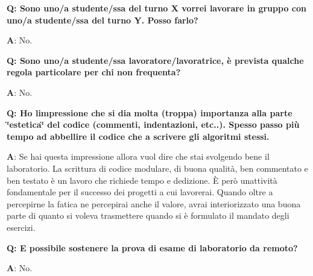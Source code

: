 {\bfseries{Q\+: Sono uno/a studente/ssa del turno X vorrei lavorare in gruppo con uno/a studente/ssa del turno Y. Posso farlo?}}

{\bfseries{A}}\+: No.

{\bfseries{Q\+: Sono uno/a studente/ssa lavoratore/lavoratrice, è prevista qualche regola particolare per chi non frequenta?}}

{\bfseries{A}}\+: No.

{\bfseries{Q\+: Ho l\textquotesingle{}impressione che si dia molta (troppa) importanza alla parte \char`\"{}estetica\char`\"{} del codice (commenti, indentazioni, etc..). Spesso passo più tempo ad abbellire il codice che a scrivere gli algoritmi stessi.}}

{\bfseries{A}}\+: Se hai questa impressione allora vuol dire che stai svolgendo bene il laboratorio. La scrittura di codice modulare, di buona qualità, ben commentato e ben testato è un lavoro che richiede tempo e dedizione. È però un\textquotesingle{}attività fondamentale per il successo dei progetti a cui lavorerai. Quando oltre a percepirne la fatica ne percepirai anche il valore, avrai interiorizzato una buona parte di quanto si voleva trasmettere quando si è formulato il mandato degli esercizi.

{\bfseries{Q\+: E\textquotesingle{} possibile sostenere la prova di esame di laboratorio da remoto?}}

{\bfseries{A}}\+: No. 